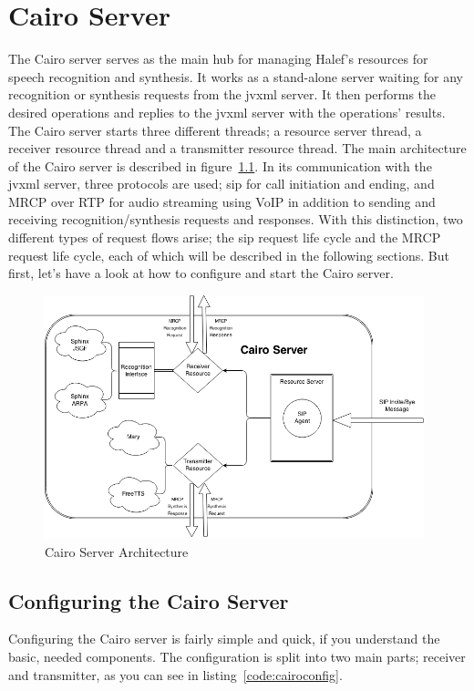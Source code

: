 \chapter{Cairo Server}\label{chap:cairo}
The Cairo server serves as the main hub for managing Halef's resources for speech recognition and synthesis.
It works as a stand-alone server waiting for any recognition or synthesis requests from the \ac{jvxml} server. It then performs the desired operations and replies to the \ac{jvxml} server with the operations' results.
The Cairo server starts three different threads; a resource server thread, a receiver resource thread and a transmitter resource thread.
The main architecture of the Cairo server is described in figure~\ref{fig:cairoserver}.
In its communication with the \ac{jvxml} server, three protocols are used; \ac{sip} for call initiation and ending, and MRCP over RTP for audio streaming using VoIP in addition to sending and receiving recognition/synthesis requests and responses.
With this distinction, two different types of request flows arise; the \ac{sip} request life cycle and the MRCP request life cycle, each of which will be described in the following sections.
But first, let's have a look at how to configure and start the Cairo server.
\begin{figure}[h]
  \centering
  \includegraphics[width=11cm]{resources/images/Cairo-Server.png}
  \caption{Cairo Server Architecture}
  \label{fig:cairoserver}
\end{figure}

\section{Configuring the Cairo Server}
Configuring the Cairo server is fairly simple and quick, if you understand the basic, needed components.
The configuration is split into two main parts; receiver and transmitter, as you can see in listing~\ref{code:cairoconfig}.


